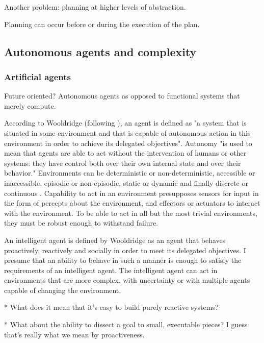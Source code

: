 Another problem: planning at higher levels of abstraction.

Planning can occur before or during the execution of the plan.

\subsection{Autonomous agents and complexity}

\subsubsection{Artificial agents}

Future oriented? Autonomous agents as opposed to functional systems that merely compute.

According to Wooldridge \citeyearpar[p.~8]{wooldridge_intelligent_2013} (following \citealt{wooldridge_intelligent_1995}), an agent is defined as "a system that is situated in some environment and that is capable of autonomous action in this environment in order to achieve its delegated objectives". Autonomy "is used to mean that agents are able to act without the intervention of humans or other systems: they have control both over their own internal state and over their behavior." Environments can be deterministic or non-deterministic, accessible or inaccessible, episodic or non-episodic, static or dynamic and finally discrete or continuous \citep[p.~6]{wooldridge_intelligent_2013}. Capability to act in an environment presupposes sensors for input in the form of percepts about the environment, and effectors or actuators to interact with the environment. To be able to act in all but the most trivial environments, they must be robust enough to withstand failure.

An intelligent agent is defined by Wooldridge \citeyearpar[p.~8]{wooldridge_intelligent_2013} as an agent that behaves proactively, reactively and socially in order to meet its delegated objectives. I presume that an ability to behave in such a manner is enough to satisfy the requirements of an intelligent agent. The intelligent agent can act in environments that are more complex, with uncertainty or with multiple agents capable of changing the environment.

* What does it mean that it's easy to build purely reactive systems? \citep[p.~9]{wooldridge_intelligent_2013} 

* What about the ability to dissect a goal to small, executable pieces? I guess that's really what we mean by proactiveness.

